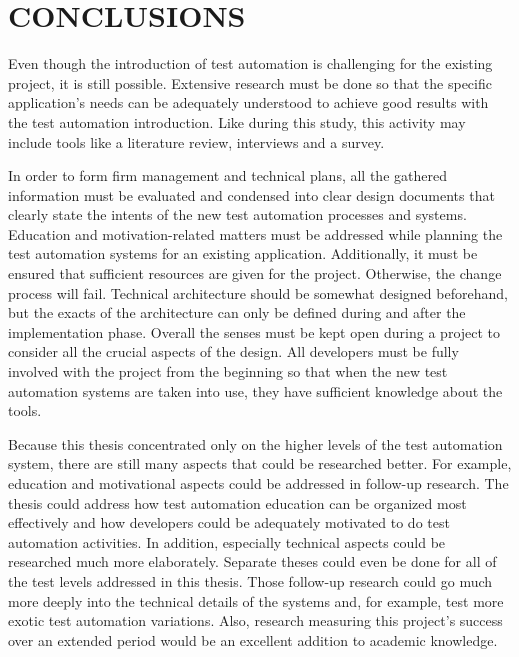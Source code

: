 \chapter{CONCLUSIONS}\label{chapter:conclusions}
Even though the introduction of test automation is challenging for the existing project, it is still possible. Extensive research must be done so that the specific application's needs can be adequately understood to achieve good results with the test automation introduction. Like during this study, this activity may include tools like a literature review, interviews and a survey.

In order to form firm management and technical plans, all the gathered information must be evaluated and condensed into clear design documents that clearly state the intents of the new test automation processes and systems. Education and motivation-related matters must be addressed while planning the test automation systems for an existing application. Additionally, it must be ensured that sufficient resources are given for the project. Otherwise, the change process will fail. Technical architecture should be somewhat designed beforehand, but the exacts of the architecture can only be defined during and after the implementation phase. Overall the senses must be kept open during a project to consider all the crucial aspects of the design. All developers must be fully involved with the project from the beginning so that when the new test automation systems are taken into use, they have sufficient knowledge about the tools.

Because this thesis concentrated only on the higher levels of the test automation system, there are still many aspects that could be researched better. For example, education and motivational aspects could be addressed in follow-up research. The thesis could address how test automation education can be organized most effectively and how developers could be adequately motivated to do test automation activities. In addition, especially technical aspects could be researched much more elaborately. Separate theses could even be done for all of the test levels addressed in this thesis. Those follow-up research could go much more deeply into the technical details of the systems and, for example, test more exotic test automation variations. Also, research measuring this project's success over an extended period would be an excellent addition to academic knowledge.